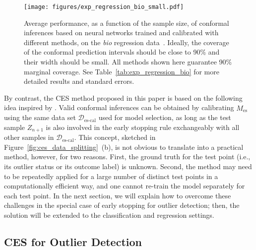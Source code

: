 \begin{figure}[!htb]
    \centering
    \texttt{[image: figures/exp\_regression\_bio\_small.pdf]}\vspace{-0.3cm}
    \caption{Average performance, as a function of the sample size, of conformal inferences based on neural networks trained and calibrated with different methods, on the {\em bio} regression data~\citep{data-bio}. Ideally, the coverage of the conformal prediction intervals should be close to 90\% and their width should be small. All methods shown here guarantee 90\% marginal coverage. See Table~\ref{tab:exp_regression_bio} for more detailed results and standard errors.}
    \label{fig:exp_regression_bio}
\end{figure}

By contrast, the CES method proposed in this paper is based on the following idea inspired by \citet{Liang_2022_integrative_p_val}.
Valid conformal inferences can be obtained by calibrating $\hat{M}_{\text{es}}$ using the same data set $\mathcal{D}_{\text{es-cal}}$ used for model selection, as long as the test sample  $Z_{n+1}$ is also involved in the early stopping rule exchangeably with all other samples in $\mathcal{D}_{\text{es-cal}}$.
This concept, sketched in Figure~\ref{fig:ces_data_splitting}~(b), is not obvious to translate into a practical method, however, for two reasons.
First, the ground truth for the test point (i.e., its outlier status or its outcome label) is unknown. Second, the method may need to be repeatedly applied for a large number of distinct test points in a computationally efficient way, and one cannot re-train the model separately for each test point.
In the next section, we will explain how to overcome these challenges in the special case of early stopping for outlier detection; then, the solution will be extended to the classification and regression settings.

\subsection{CES for Outlier Detection} \label{sec:outlier}


